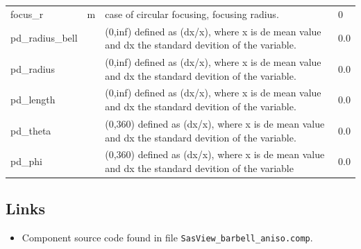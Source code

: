 \begin{longtable}{p{}p{}p{}p{}}
focus\_r & m & case of circular focusing, focusing radius. & 0 \\
pd\_radius\_bell &  & (0,inf) defined as (dx/x), where x is de mean value and dx the standard devition of the variable. & 0.0 \\
pd\_radius &  & (0,inf) defined as (dx/x), where x is de mean value and dx the standard devition of the variable. & 0.0 \\
pd\_length &  & (0,inf) defined as (dx/x), where x is de mean value and dx the standard devition of the variable. & 0.0 \\
pd\_theta &  & (0,360) defined as (dx/x), where x is de mean value and dx the standard devition of the variable. & 0.0 \\
pd\_phi &  & (0,360) defined as (dx/x), where x is de mean value and dx the standard devition of the variable & 0.0 \\
\bottomrule
\end{longtable}

\subsection*{Links}
\begin{itemize}
  \item Component source code found in file \texttt{SasView\_barbell\_aniso.comp}.
\end{itemize}
